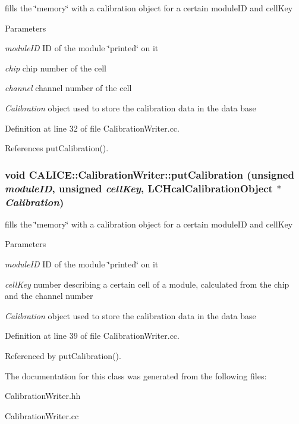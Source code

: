 fills the \char`\"{}memory\char`\"{} with a calibration object for a certain moduleID and cellKey 
\begin{DoxyParams}{Parameters}
\item[{\em moduleID}]ID of the module \char`\"{}printed\char`\"{} on it \item[{\em chip}]chip number of the cell \item[{\em channel}]channel number of the cell \item[{\em Calibration}]object used to store the calibration data in the data base \end{DoxyParams}


Definition at line 32 of file CalibrationWriter.cc.

References putCalibration().
\subsubsection[{putCalibration}]{\setlength{\rightskip}{0pt plus 5cm}void CALICE::CalibrationWriter::putCalibration (unsigned {\em moduleID}, \/  unsigned {\em cellKey}, \/  {\bf LCHcalCalibrationObject} $\ast$ {\em Calibration})}\label{classCALICE_1_1CalibrationWriter_a82e7ad14e258b9dd9635302999748b55}


fills the \char`\"{}memory\char`\"{} with a calibration object for a certain moduleID and cellKey 
\begin{DoxyParams}{Parameters}
\item[{\em moduleID}]ID of the module \char`\"{}printed\char`\"{} on it \item[{\em cellKey}]number describing a certain cell of a module, calculated from the chip and the channel number \item[{\em Calibration}]object used to store the calibration data in the data base \end{DoxyParams}


Definition at line 39 of file CalibrationWriter.cc.

Referenced by putCalibration().

The documentation for this class was generated from the following files:\begin{DoxyCompactItemize}
\item 
CalibrationWriter.hh\item 
CalibrationWriter.cc\end{DoxyCompactItemize}
